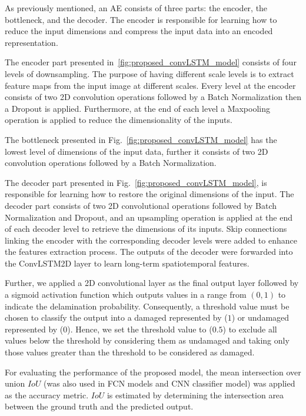 As previously mentioned, an AE consists of three parts: the encoder, the bottleneck, and the decoder.
The encoder is responsible for learning how to reduce the input dimensions and compress the input data into an encoded representation.

The encoder part presented in~\ref{fig:proposed_convLSTM_model} consists of four levels of downsampling. 
The purpose of having different scale levels is to extract feature maps from the input image at different scales.
Every level at the encoder consists of two 2D convolution operations followed by a Batch Normalization then a Dropout is applied. 
Furthermore, at the end of each level a Maxpooling operation is applied to reduce the dimensionality of the inputs. 

The bottleneck presented in Fig.~\ref{fig:proposed_convLSTM_model} has the lowest level of dimensions of the input data, further it consists of two 2D convolution operations followed by a Batch Normalization.

The decoder part presented in Fig.~\ref{fig:proposed_convLSTM_model}, is responsible for learning how to restore the original dimensions of the input.
The decoder part consists of two 2D convolutional operations followed by Batch Normalization and Dropout, and an upsampling operation is applied at the end of each decoder level to retrieve the dimensions of its inputs.
Skip connections linking the encoder with the corresponding decoder levels were added to enhance the features extraction process.
The outputs of the decoder were forwarded into the ConvLSTM2D layer to learn long-term spatiotemporal features.

Further, we applied a 2D convolutional layer as the final output layer followed by a sigmoid activation function which outputs values in a range from \((0,1)\) to indicate the delamination probability.
Consequently, a threshold value must be chosen to classify the output into a damaged represented by (\(1\)) or undamaged represented by (\(0\)).
Hence, we set the threshold value to (\(0.5\)) to exclude all values below the threshold by considering them as undamaged and taking only those values greater than the threshold to be considered as damaged.

For evaluating the performance of the proposed model, the mean 
intersection over union \(IoU\) (was also used in FCN models and CNN classifier model) was applied as the accuracy metric. 
\(IoU\) is estimated by determining the intersection
area between the ground truth and the predicted output. 
\newpage